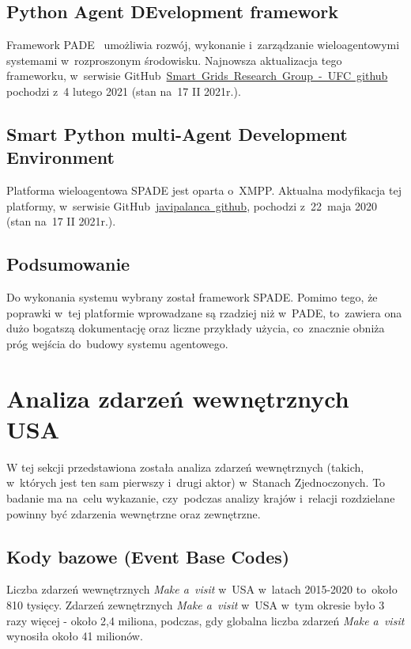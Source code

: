 \documentclass[11pt]{report}
\begin{document}
    \subsection{Python Agent DEvelopment framework}
    Framework PADE~\cite{Melo2019} umożliwia rozwój, wykonanie i~zarządzanie wieloagentowymi systemami w~rozproszonym środowisku.
    Najnowsza aktualizacja tego frameworku, w~serwisie GitHub~\href{https://github.com/grei-ufc/pade}{Smart~Grids~Research~Group~-~UFC~github} pochodzi z~4 lutego 2021 (stan na~17 II 2021r.).

    \subsection{Smart Python multi-Agent Development Environment}
    Platforma wieloagentowa SPADE jest oparta o~XMPP\cite{Saint-Andre2007}.
    Aktualna modyfikacja tej platformy, w~serwisie GitHub~\href{https://github.com/javipalanca/spade}{javipalanca~github}, pochodzi z~22~maja 2020 (stan na~17 II 2021r.).
    \enlargethispage{1\baselineskip}

    \subsection{Podsumowanie}
    Do wykonania systemu wybrany został framework SPADE\@.
    Pomimo tego, że poprawki w~tej platformie wprowadzane są rzadziej niż w~PADE, to~zawiera ona dużo bogatszą dokumentację
    oraz liczne przykłady użycia, co~znacznie obniża próg wejścia do~budowy systemu agentowego.


    \section{Analiza zdarzeń wewnętrznych USA}
    W tej sekcji przedstawiona została analiza zdarzeń wewnętrznych (takich, w~których jest ten sam pierwszy i~drugi aktor) w~Stanach Zjednoczonych.
    To badanie ma na~celu wykazanie, czy~podczas analizy krajów i~relacji rozdzielane powinny być zdarzenia wewnętrzne oraz zewnętrzne.

    \subsection{Kody bazowe (Event Base Codes)}\label{subsec:kody-bazowenullevent-base-codesnull}

    Liczba zdarzeń wewnętrznych \textit{Make a~visit} w~USA w~latach 2015-2020 to~około 810 tysięcy.
    Zdarzeń zewnętrznych \textit{Make a~visit} w~USA w~tym okresie było 3 razy więcej - około 2,4 miliona,
    podczas, gdy globalna liczba zdarzeń \textit{Make a~visit} wynosiła około 41 milionów.
\end{document}
